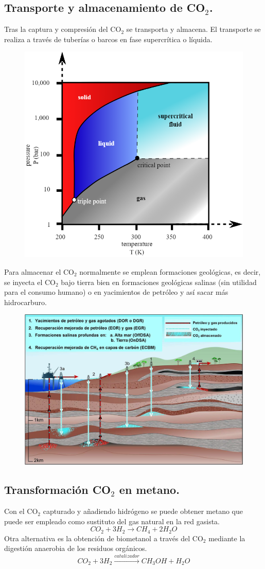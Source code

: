 \subsection{Transporte y almacenamiento de CO$_2$.}
Tras la captura y compresión del CO$_2$ se transporta y almacena. El transporte se realiza a través de tuberías o barcos en fase supercrítica o líquida.
\begin{figure}[H]
	\centering
	\includegraphics[width=0.4\linewidth]{res/tema3/triple}
	\label{fig:triple}
\end{figure}
Para almacenar el CO$_2$ normalmente se emplean formaciones geológicas, es decir, se inyecta el CO$_2$ bajo tierra bien en formaciones geológicas salinas (sin utilidad para el consumo humano) o en yacimientos de petróleo y así sacar más hidrocarburo.
\begin{figure}[H]
	\centering
	\includegraphics[width=0.5\linewidth]{res/tema3/almacen1}
	\label{fig:almacen1}
\end{figure}

\subsection{Transformación CO$_2$ en metano.}
Con el CO$_2$ capturado y añadiendo hidrógeno se puede obtener metano que puede ser empleado como sustituto del gas natural en la red gasista. 
\[CO_2+3H_2\rightarrow CH_4+2H_2O\]
Otra alternativa es la obtención de biometanol a través del CO$_2$ mediante la digestión anaerobia de los residuos orgánicos.
\[CO_2+3H_2\xrightarrow{catalizador} CH_3OH+H_2O\]
